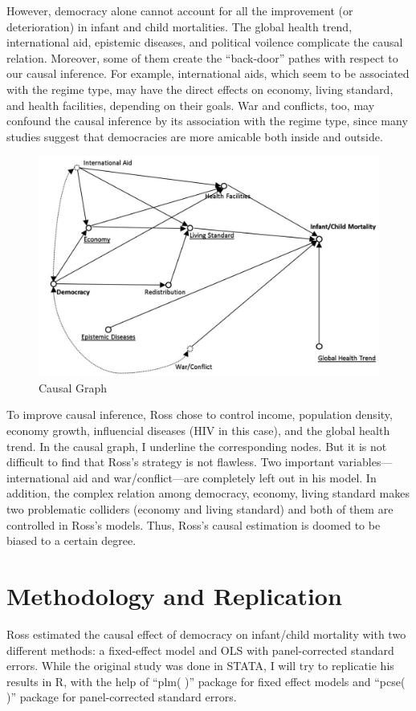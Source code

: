 \documentclass[12pt, lelterpaper, reqno]{article}\usepackage[]{graphicx}\usepackage[]{color}
\begin{document}
However, democracy alone cannot account for all the improvement (or deterioration) in infant and child mortalities. The global health trend, international aid, epistemic diseases, and political voilence complicate the causal relation. Moreover, some of them create the ``back-door'' pathes with respect to our causal inference. For example, international aids, which seem to be associated with the regime type, may have the direct effects on economy, living standard, and health facilities, depending on their goals. War and conflicts, too, may confound the causal inference by its association with the regime type, since many studies suggest that democracies are more amicable both inside and outside.

\begin{figure}[H]
	\centering
	\includegraphics[width=140mm]{cg.jpg}
	\caption{Causal Graph}
\end{figure}

To improve causal inference, Ross chose to control income, population density, economy growth, influencial diseases (HIV in this case), and the global health trend. In the causal graph, I underline the corresponding nodes. But it is not difficult to find that Ross's strategy is not flawless. Two important variables---international aid and war/conflict---are completely left out in his model. In addition, the complex relation among democracy, economy, living standard makes two problematic colliders (economy and living standard) and both of them are controlled in Ross's models. Thus, Ross's causal estimation is doomed to be biased to a certain degree.

\section{Methodology and Replication}
Ross estimated the causal effect of democracy on infant/child mortality with two different methods: a fixed-effect model and OLS with panel-corrected standard errors. While the original study was done in STATA, I will try to replicatie his results in R, with the help of ``plm( )'' package for fixed effect models and ``pcse( )'' package for panel-corrected standard errors.
\end{document}
